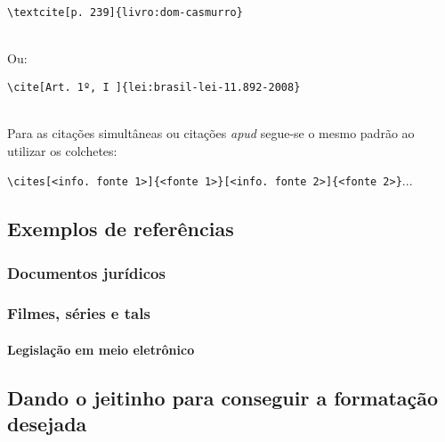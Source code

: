 \verb|\textcite[p. 239]{livro:dom-casmurro}|

\textcite[p. 239]{livro:dom-casmurro}\\

Ou:

\verb|\cite[Art. 1º, I ]{lei:brasil-lei-11.892-2008}|

\cite[Art. 1º, I ]{lei:brasil-lei-11.892-2008}\\

Para as citações simultâneas ou citações \textit{apud} segue-se o mesmo padrão ao utilizar os colchetes:

\verb|\cites[<info. fonte 1>]{<fonte 1>}[<info. fonte 2>]{<fonte 2>}|...

\subsection{Exemplos de referências}

\subsubsection{Documentos jurídicos}

\subsubsection{Filmes, séries e tals}


\paragraph{Legislação em meio eletrônico}

\subsection{Dando o jeitinho para conseguir a formatação desejada}

